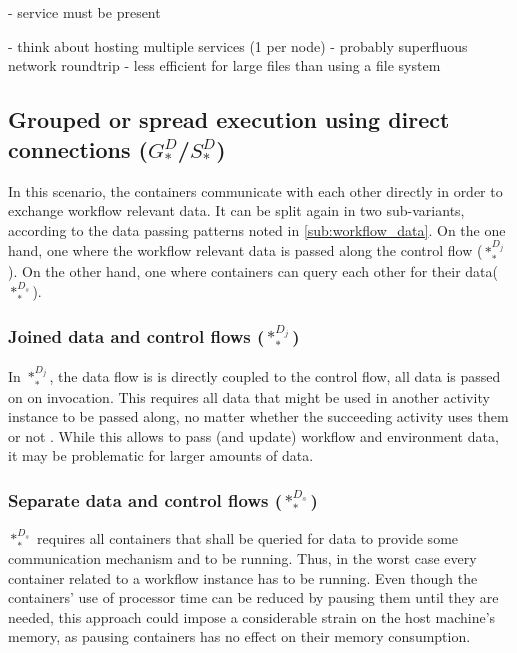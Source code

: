   - service must be present

  - think about hosting multiple services (1 per node)
  - probably superfluous network roundtrip
  - less efficient for large files than using a file system


\subsection[Grouped or spread execution using direct connections]{Grouped or spread execution using direct connections ($G_{*}^{D}$/$S_{*}^{D}$)} %
\label{sub:grouped_execution_using_direct_connections}

  In this scenario, the containers communicate with each other directly in order to exchange workflow relevant data. It can be split again in two sub-variants, according to the data passing patterns noted in \ref{sub:workflow_data}. On the one hand, one where the workflow relevant data is passed along the control flow ($*_{*}^{D_j}$). On the other hand, one where containers can query each other for their data($*_{*}^{D_s}$).

  \subsubsection{Joined data and control flows ($*_{*}^{D_j}$)} %
    In $*_{*}^{D_j}$, the data flow is is directly coupled to the control flow, \ie all data is passed on on invocation. This requires all data that might be used in another activity instance to be passed along, no matter whether the succeeding activity uses them or not \cite{Russell2005Workflow}. While this allows to pass (and update) workflow and environment data, it may be problematic for larger amounts of data.

  \subsubsection{Separate data and control flows ($*_{*}^{D_s}$)} %
    $*_{*}^{D_s}$ requires all containers that shall be queried for data to provide some communication mechanism and to be running. Thus, in the worst case every container related to a workflow instance has to be running. Even though the containers' use of processor time can be reduced by pausing them until they are needed, this approach could impose a considerable strain on the host machine's memory, as pausing containers has no effect on their memory consumption.

